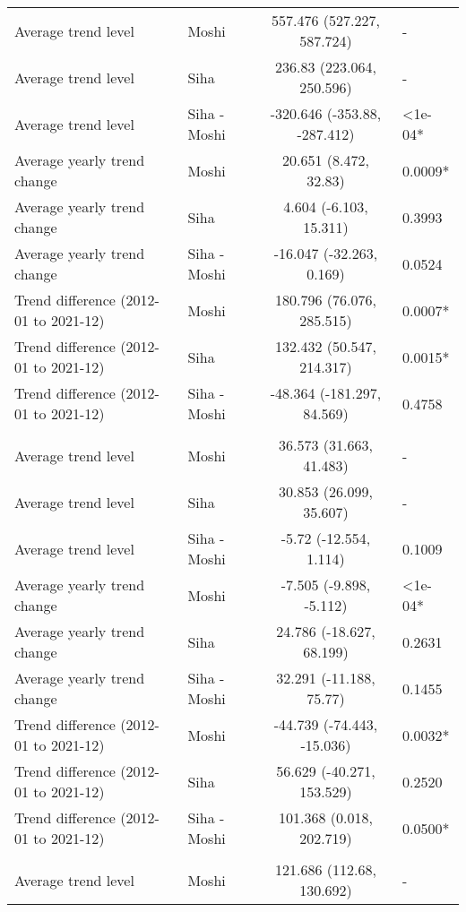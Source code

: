 \begin{longtable}{l|lcl}
\midrule\addlinespace[2.5pt]
\multicolumn{4}{l}{Diabetes Mellitus} \\[2.5pt] 
\midrule\addlinespace[2.5pt]
Average trend level & Moshi & 557.476 (527.227, 587.724) & - \\ 
Average trend level & Siha & 236.83 (223.064, 250.596) & - \\ 
Average trend level & Siha - Moshi & -320.646 (-353.88, -287.412) & <1e-04* \\ 
Average yearly trend change & Moshi & 20.651 (8.472, 32.83) & 0.0009* \\ 
Average yearly trend change & Siha & 4.604 (-6.103, 15.311) & 0.3993 \\ 
Average yearly trend change & Siha - Moshi & -16.047 (-32.263, 0.169) & 0.0524 \\ 
Trend difference (2012-01 to 2021-12) & Moshi & 180.796 (76.076, 285.515) & 0.0007* \\ 
Trend difference (2012-01 to 2021-12) & Siha & 132.432 (50.547, 214.317) & 0.0015* \\ 
Trend difference (2012-01 to 2021-12) & Siha - Moshi & -48.364 (-181.297, 84.569) & 0.4758 \\ 
\midrule\addlinespace[2.5pt]
\multicolumn{4}{l}{Dysentery} \\[2.5pt] 
\midrule\addlinespace[2.5pt]
Average trend level & Moshi & 36.573 (31.663, 41.483) & - \\ 
Average trend level & Siha & 30.853 (26.099, 35.607) & - \\ 
Average trend level & Siha - Moshi & -5.72 (-12.554, 1.114) & 0.1009 \\ 
Average yearly trend change & Moshi & -7.505 (-9.898, -5.112) & <1e-04* \\ 
Average yearly trend change & Siha & 24.786 (-18.627, 68.199) & 0.2631 \\ 
Average yearly trend change & Siha - Moshi & 32.291 (-11.188, 75.77) & 0.1455 \\ 
Trend difference (2012-01 to 2021-12) & Moshi & -44.739 (-74.443, -15.036) & 0.0032* \\ 
Trend difference (2012-01 to 2021-12) & Siha & 56.629 (-40.271, 153.529) & 0.2520 \\ 
Trend difference (2012-01 to 2021-12) & Siha - Moshi & 101.368 (0.018, 202.719) & 0.0500* \\ 
\midrule\addlinespace[2.5pt]
\multicolumn{4}{l}{Epilepsy} \\[2.5pt] 
\midrule\addlinespace[2.5pt]
Average trend level & Moshi & 121.686 (112.68, 130.692) & - \\ 

\end{longtable}
